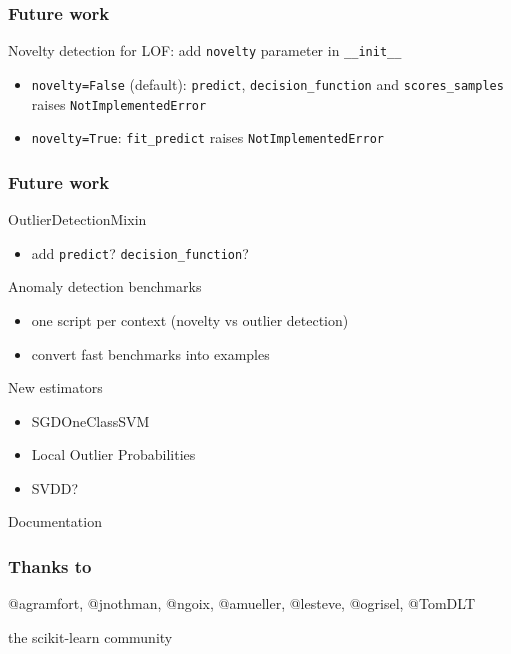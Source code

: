 \documentclass[slidetop,11pt]{beamer}
\begin{document}
\begin{frame}\frametitle{Future work}

Novelty detection for LOF: add \texttt{novelty} parameter in \texttt{__init__}
\begin{itemize}
  \item \texttt{novelty=False} (default): \texttt{predict}, \texttt{decision_function} and \texttt{scores_samples} raises \texttt{NotImplementedError}
  \item \texttt{novelty=True}: \texttt{fit_predict} raises \texttt{NotImplementedError}
\end{itemize}

\end{frame}


\begin{frame}\frametitle{Future work}

OutlierDetectionMixin
\begin{itemize}
  \item add \texttt{predict}? \texttt{decision_function}?
\end{itemize}

Anomaly detection benchmarks
\begin{itemize}
  \item one script per context (novelty vs outlier detection)
  \item convert fast benchmarks into examples
\end{itemize}

New estimators
\begin{itemize}
  \item SGDOneClassSVM
  \item Local Outlier Probabilities
  \item SVDD?
\end{itemize}

Documentation

\end{frame}


\begin{frame}\frametitle{Thanks to}
\begin{center}
@agramfort,  @jnothman, @ngoix, @amueller, @lesteve, @ogrisel, @TomDLT
\end{center}

\begin{center}
the scikit-learn community
\end{center}


\end{frame}
\end{document}
